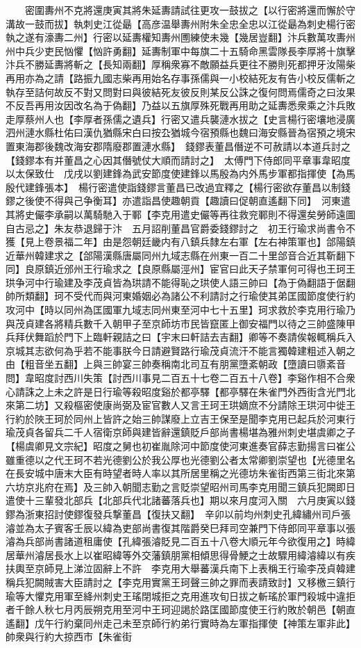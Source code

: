 　　密圍夀州不克將還庚寅其將朱延夀請試往更攻一鼓拔之【以行密將還而懈於守溝故一鼓而拔】執刺史江從朂【高彦温舉夀州附朱全忠全忠以江從朂為刺史楊行密執之遂有濠夀二州】行密以延夀權知夀州圑練使未幾【幾居豈翻】汴兵數萬攻夀州州中兵少吏民忷懼【忷許勇翻】延夀制軍中每旗二十五騎命黑雲隊長李厚將十旗擊汴兵不勝延夀將斬之【長知兩翻】厚稱衆寡不敵願益兵更往不勝則死都押牙汝陽柴再用亦為之請【路振九國志柴再用始名存事孫儒與一小校結死友有告小校反儒斬之執存至詰何故反不對又問對曰與彼結死友彼反則某反公誅之復何問焉儒奇之曰汝果不反吾再用汝因改名為于偽翻】乃益以五旗厚殊死戰再用助之延夀悉衆乘之汴兵敗走厚蔡州人也【李厚者孫儒之遺兵】行密又遣兵襲漣水拔之【史言楊行密壤地浸廣泗州漣水縣杜佑曰漢仇猶縣宋白曰按厹猶城今宿預縣也魏曰海安縣晉為宿預之境宋置東海郡後魏改海安郡隋廢郡置漣水縣】　錢鏐表董昌僭逆不可赦請以本道兵討之【錢鏐本有并董昌之心因其僭號仗大順而請討之】　太傅門下侍郎同平章事韋昭度以太保致仕　戊戌以劉建鋒為武安節度使建鋒以馬殷為内外馬步軍都指揮使【為馬殷代建鋒張本】　楊行密遣使詣錢鏐言董昌已改過宜釋之【楊行密欲存董昌以制錢鏐之後使不得與己争衡耳】亦遣詣昌使趣朝貢【趣讀曰促朝直遙翻下同】　河東遣其將史儼李承嗣以萬騎馳入于鄆【李克用遣史儼等再往救兖鄆則不得還矣勞師遠圖自古忌之】朱友恭退歸于汴　五月詔削董昌官爵委錢鏐討之　初王行瑜求尚書令不獲【見上卷景福二年】由是怨朝廷畿内有八鎮兵隸左右軍【左右神策軍也】郃陽鎮近華州韓建求之【郃陽漢縣唐屬同州九域志縣在州東一百二十里郃音合近其靳翻下同】良原鎮近邠州王行瑜求之【良原縣屬涇州】宦官曰此天子禁軍何可得也王珂王珙争河中行瑜建及李茂貞皆為珙請不能得恥之珙使人語三帥曰【為于偽翻語于倨翻帥所類翻】珂不受代而與河東婚姻必為諸公不利請討之行瑜使其弟匡國節度使行約攻河中【時以同州為匡國軍九域志同州東至河中七十五里】珂求救於李克用行瑜乃與茂貞建各將精兵數千入朝甲子至京師坊市民皆竄匿上御安福門以待之三帥盛陳甲兵拜伏舞蹈於門下上臨軒親詰之曰【宇末曰軒詰去吉翻】卿等不奏請俟報輒稱兵入京城其志欲何為乎若不能事朕今日請避賢路行瑜茂貞流汗不能言獨韓建粗述入朝之由【粗音坐五翻】上與三帥宴三帥奏稱南北司互有朋黨墮紊朝政【墮讀曰隳紊音問】韋昭度討西川失策【討西川事見二百五十七卷二百五十八卷】李谿作相不合衆心請誅之上未之許是日行瑜等殺昭度谿於都亭驛【都亭驛在朱雀門外西街含光門北來第二坊】又殺樞密使康尚弼及宦官數人又言王珂王珙嫡庶不分請除王珙河中徙王行約於陜王珂於同州上皆許之始三帥謀廢上立吉王保至是聞李克用已起兵於河東行瑜茂貞各留兵二千人宿衛京師與建皆辭還鎮貶戶部尚書楊堪為雅州刺史堪虞卿之子【楊虞卿見文宗紀】昭度之舅也初崔胤除河中節度使河東進奏官薛志勤揚言曰崔公雖重德以之代王珂不若光德劉公於我公厚也光德劉公者太常卿劉崇望也【光德里名在長安城中唐末大臣有時望者時人率以其所居里稱之光德坊朱雀街西第三街北來第六坊京兆府在焉】及三帥入朝聞志勤之言貶崇望昭州司馬李克用聞三鎮兵犯闕即日遣使十三輩發北部兵【北部兵代北諸蕃落兵也】期以來月度河入關　六月庚寅以錢鏐為浙東招討使鏐復發兵撃董昌【復扶又翻】　辛卯以前均州刺史孔緯繡州司戶張濬並為太子賓客壬辰以緯為吏部尚書復其階爵癸巳拜司空兼門下侍郎同平章事以張濬為兵部尚書諸道租庸使【孔緯張濬貶見二百五十八卷大順元年今欲復用之】時緯居華州濬居長水上以崔昭緯等外交藩鎮朋黨相傾思得骨鯁之士故驟用緯濬緯以有疾扶輿至京師見上涕泣固辭上不許　李克用大舉蕃漢兵南下上表稱王行瑜李茂貞韓建稱兵犯闕賊害大臣請討之【李克用實黨王珂聲三帥之罪而表請致討】又移檄三鎮行瑜等大懼克用軍至絳州刺史王瑤閉城拒之克用進攻旬日拔之斬瑤於軍門殺城中違拒者千餘人秋七月丙辰朔克用至河中王珂迎謁於路匡國節度使王行約敗於朝邑【朝直遙翻】戊午行約棄同州走己未至京師行約弟行實時為左軍指揮使【神策左軍非此】帥衆與行約大掠西市【朱雀街